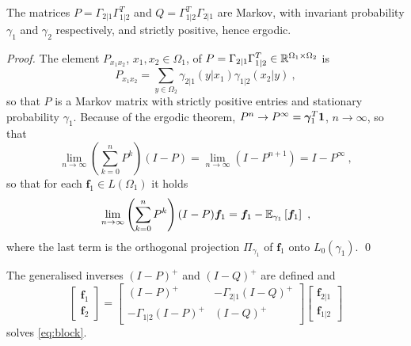 \documentclass[runningheads]{llncs}
\begin{document}
\begin{proposition}The matrices $P = \Gamma_{2|1}\Gamma_{1|2}^T$ and $Q = \Gamma_{1|2}^T\Gamma_{2|1}$ are Markov, with invariant probability $\gamma_1$ and $\gamma_2$ respectively, and strictly positive, hence ergodic.
\end{proposition}

\begin{proof}The element $P_{x_1x_2}$, $x_1,x_2 \in \Omega_1$, of $P = \Gamma_{2|1}\Gamma_{1|2}^T \in \mathbb R^{\Omega_1 \times \Omega_2}$ is
%
\begin{equation*}
  P_{x_1x_2} = \sum_{y \in \Omega_2} \gamma_{2|1}(y|x_1) \gamma_{1|2}(x_2|y) \ ,
\end{equation*}
%
so that $P$ is a Markov matrix with strictly positive entries and stationary probability $\gamma_1$. Because of the ergodic theorem, $P^n \to P^\infty = {\bm \gamma}_1^T \bm 1$, $n \to \infty$, so that 
%
\begin{equation*}
\lim_{n\to\infty} \left(\sum_{k=0}^n P^k\right)(I-P) = \lim_{n\to\infty} \left(I - P^{n+1}\right) = I - P^\infty \ , 
\end{equation*}
%
so that for each $\bm f_1 \in L(\Omega_1)$ it holds
%
\begin{equation*}
  \lim_{n\to\infty} \left(\sum_{k=0}^n P^k\right)(I-P) \bm f_1 = \bm f_1 - {\operatorname{\mathbb E}}_{\gamma_1}\left[\bm f_1\right] \ ,
\end{equation*}
%
where the last term is the orthogonal projection $\Pi_{\gamma_1}$ of $\bm f_1$ onto $L_0(\gamma_1)$. \qed
\end{proof}

\begin{proposition}The generalised inverses $(I-P)^+$ and $(I-Q)^+$ are defined and 
%
  \begin{equation*}
  \begin{bmatrix}
    \bm f_1 \\ \bm f_2
  \end{bmatrix}
=
    \begin{bmatrix}
      (I - P)^+ & - \Gamma_{2|1}(I - Q)^+ \\
- \Gamma_{1|2}(I-P)^+ & (I-Q)^+
    \end{bmatrix}
    \begin{bmatrix}
      \bm f_{2|1} \\ \bm f_{1|2}
    \end{bmatrix}
  \end{equation*}
%
solves \cref{eq:block}.
\end{proposition}
\end{document}

